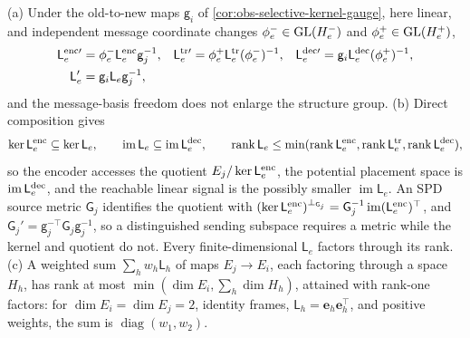 (a) Under the old-to-new maps \(\mathsf g_i\) of
\cref{cor:obs-selective-kernel-gauge}, here linear, and independent message
coordinate changes \(\phi_e^-\in\mathrm{GL}(H_e^-)\) and \(\phi_e^+\in\mathrm{GL}(H_e^+)\),
\begin{align}
\mathsf L^{\rm enc\prime}_e&=\phi_e^-\mathsf L^{\rm enc}_e\mathsf g_j^{-1},&
\mathsf L^{\rm tr\prime}_e&=\phi_e^+\mathsf L^{\rm tr}_e(\phi_e^-)^{-1},&
\mathsf L^{\rm dec\prime}_e&=\mathsf g_i\mathsf L^{\rm dec}_e(\phi_e^+)^{-1},\nonumber\\
\mathsf L_e'&=\mathsf g_i\mathsf L_e\mathsf g_j^{-1},
\label{eq:geo-selective-covariance}
\end{align}
and the message-basis freedom does not enlarge the structure group. (b) Direct
composition gives
\begin{equation}
\ker\mathsf L^{\rm enc}_e\subseteq\ker\mathsf L_e,\qquad
\operatorname{im}\mathsf L_e\subseteq\operatorname{im}\mathsf L^{\rm dec}_e,\qquad
\operatorname{rank}\mathsf L_e\leq
\min(\operatorname{rank}\mathsf L^{\rm enc}_e,\operatorname{rank}\mathsf L^{\rm tr}_e,
\operatorname{rank}\mathsf L^{\rm dec}_e),
\label{eq:geo-selective-rank}
\end{equation}
so the encoder accesses the quotient \(E_j/\ker\mathsf L^{\rm enc}_e\), the
potential placement space is \(\operatorname{im}\mathsf L^{\rm dec}_e\), and the
reachable linear signal is the possibly smaller \(\operatorname{im}\mathsf L_e\).
An SPD source metric \(\mathsf G_j\) identifies the quotient with
\((\ker\mathsf L^{\rm enc}_e)^{\perp_{\mathsf G_j}}
=\mathsf G_j^{-1}\operatorname{im}(\mathsf L^{\rm enc}_e)^\top\), and
\(\mathsf G_j'=\mathsf g_j^{-\top}\mathsf G_j\mathsf g_j^{-1}\), so a
distinguished sending subspace requires a metric while the kernel and quotient
do not. Every finite-dimensional \(\mathsf L_e\) factors through its rank. (c) A
weighted sum \(\sum_hw_h\mathsf L_h\) of maps \(E_j\to E_i\), each factoring
through a space \(H_h\), has rank at most \(\min(\dim E_i,\sum_h\dim H_h)\),
attained with rank-one factors: for \(\dim E_i=\dim E_j=2\), identity frames,
\(\mathsf L_h=\mathbf e_h\mathbf e_h^\top\), and positive weights, the sum is
\(\operatorname{diag}(w_1,w_2)\).

